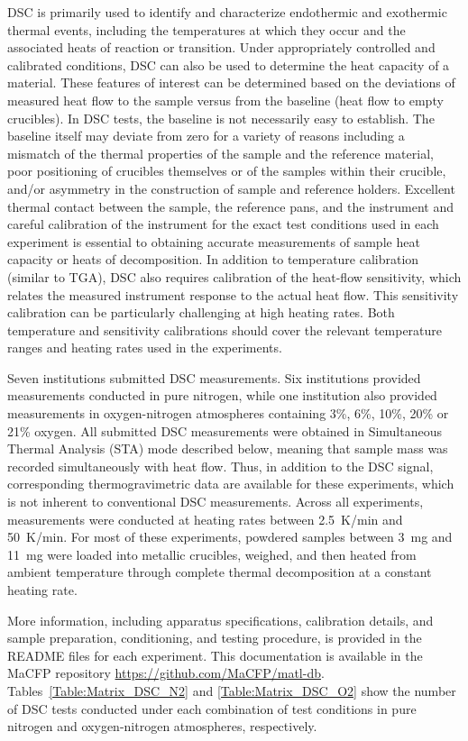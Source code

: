 \documentclass{book}
\begin{document}
DSC is primarily used to identify and characterize endothermic and exothermic thermal events, including the temperatures at which they occur and the associated heats of reaction or transition. Under appropriately controlled and calibrated conditions, DSC can also be used to determine the heat capacity of a material. These features of interest can be determined based on the deviations of measured heat flow to the sample versus from the baseline (heat flow to empty crucibles). In DSC tests, the baseline is not necessarily easy to establish. The baseline itself may deviate from zero for a variety of reasons including a mismatch of the thermal properties of the sample and the reference material, poor positioning of crucibles themselves or of the samples within their crucible, and/or asymmetry in the construction of sample and reference holders. Excellent thermal contact between the sample, the reference pans, and the instrument and careful calibration of the instrument for the exact test conditions used in each experiment is essential to obtaining accurate measurements of sample heat capacity or heats of decomposition. In addition to temperature calibration (similar to TGA), DSC also requires calibration of the heat-flow sensitivity, which relates the measured instrument response to the actual heat flow. This sensitivity calibration can be particularly challenging at high heating rates. Both temperature and sensitivity calibrations should cover the relevant temperature ranges and heating rates used in the experiments.

Seven institutions submitted DSC measurements. Six institutions provided measurements conducted in pure nitrogen, while one institution also provided measurements in oxygen-nitrogen atmospheres containing 3\%, 6\%, 10\%, 20\% or 21\% oxygen. All submitted DSC measurements were obtained in Simultaneous Thermal Analysis (STA) mode described below, meaning that sample mass was recorded simultaneously with heat flow. Thus, in addition to the DSC signal, corresponding thermogravimetric data are available for these experiments, which is not inherent to conventional DSC measurements. Across all experiments, measurements were conducted at heating rates between 2.5~K/min and 50~K/min. For most of these experiments, powdered samples between 3~mg and 11~mg were loaded into metallic crucibles, weighed, and then heated from ambient temperature through complete thermal decomposition at a constant heating rate.

More information, including  apparatus specifications, calibration details, and sample preparation, conditioning, and testing procedure, is provided in the README files for each experiment. This documentation is available in the MaCFP repository \href{https://github.com/MaCFP/matl-db}{https://github.com/MaCFP/matl-db}. Tables~\ref{Table:Matrix_DSC_N2} and \ref{Table:Matrix_DSC_O2} show the number of DSC tests conducted under each combination of test conditions in pure nitrogen and oxygen-nitrogen atmospheres, respectively.
\end{document}
